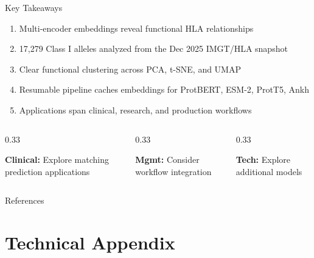 \documentclass[aspectratio=169]{beamer}
\newcommand{\formanagement}[1]{\textcolor{managementcolor}{\textbf{Mgmt:} #1}}
\newcommand{\forclinical}[1]{\textcolor{clinicalcolor}{\textbf{Clinical:} #1}}
\newcommand{\forbioinformatics}[1]{\textcolor{bioinfocolor}{\textbf{Tech:} #1}}
\begin{document}
\begin{frame}[shrink=5]{Key Takeaways}
  \begin{tcolorbox}[colback=white,colframe=hlablue!75!black]
  \begin{enumerate}\small
    \item Multi-encoder embeddings reveal functional HLA relationships
    \item 17,279 Class I alleles analyzed from the Dec 2025 IMGT/HLA snapshot
    \item Clear functional clustering across PCA, t-SNE, and UMAP
    \item Resumable pipeline caches embeddings for ProtBERT, ESM-2, ProtT5, Ankh
    \item Applications span clinical, research, and production workflows
  \end{enumerate}
  \end{tcolorbox}
  
  \begin{columns}
    \begin{column}{0.33\textwidth}
      \begin{tcolorbox}[colback=gray!5,colframe=gray!40]\small
      \forclinical{Explore matching prediction applications}
      \end{tcolorbox}
    \end{column}
    \begin{column}{0.33\textwidth}
      \begin{tcolorbox}[colback=gray!5,colframe=gray!40]\small
      \formanagement{Consider workflow integration}
      \end{tcolorbox}
    \end{column}
    \begin{column}{0.33\textwidth}
      \begin{tcolorbox}[colback=gray!5,colframe=gray!40]\small
      \forbioinformatics{Explore additional models}
      \end{tcolorbox}
    \end{column}
  \end{columns}
\end{frame}

\begin{frame}[allowframebreaks]{References}
  
\end{frame}

\appendix
\section{Technical Appendix}
\end{document}
